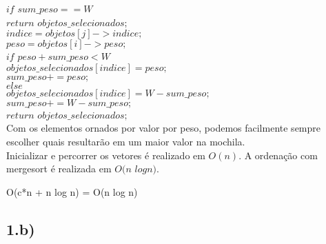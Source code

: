 \documentclass[10pt,a4paper]{article}
\begin{document}
	\hspace{2cm}$if$ $sum\_peso == W$\\
	
	\hspace{3cm}$return$ $objetos\_selecionados;$\\
	
	\hspace{2cm}$indice = objetos[j]->indice;$\\
	
	\hspace{2cm}$peso =  objetos[i]->peso;$\\

	\hspace{2cm}$if$ $peso + sum\_peso < W$\\
	
	\hspace{3cm}$objetos\_selecionados[indice] = peso;$\\
	
	\hspace{3cm}$sum\_peso+=peso;$\\
	
	\hspace{2cm}$else$\\
	
	\hspace{3cm}$objetos\_selecionados[indice] = W-sum\_peso;$\\
	
	\hspace{3cm}$sum\_peso+=W-sum\_peso;$\\
	
	\hspace{1cm}$return$ $objetos\_selecionados;$\\
	
	
	Com os elementos ornados por valor por peso, podemos facilmente sempre escolher quais resultarão em um maior valor na mochila.\\
	
	Inicializar e percorrer os vetores é realizado em $O(n)$. A ordenação com mergesort é realizada em $O(n$ $log n)$.\\
	
	\begin{center}
		O(c*n + n log n) = O(n log n)
\end{center}	 
	
	
	\subsection*{1.b)}
	
\end{document}
